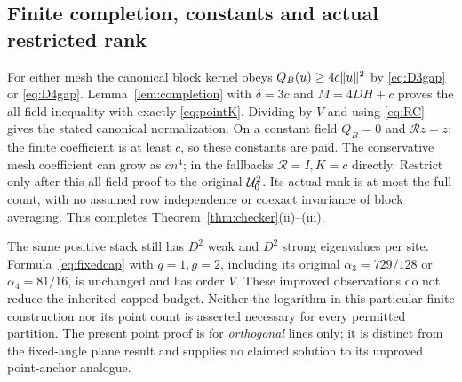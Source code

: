 \subsection{Finite completion, constants and actual restricted rank}
For either mesh the canonical block kernel obeys
$Q_B(u)\geq4c\lVert u\rVert^2$ by \eqref{eq:D3gap} or \eqref{eq:D4gap}.
Lemma~\ref{lem:completion} with $\delta=3c$ and $M=4DH+c$ proves the
all-field inequality with exactly \eqref{eq:pointK}. Dividing by $V$ and
using \eqref{eq:RC} gives the stated canonical normalization. On a constant
field $Q_B=0$ and $\mathcal Rz=z$; the finite coefficient is at least $c$,
so these constants are paid. The conservative mesh coefficient can grow as
$cn^4$; in the fallbacks $\mathcal R=I,K=c$ directly.
Restrict only after this all-field proof to the original $\mathcal U_0^2$.
Its actual rank is at most the full count, with no assumed row independence
or coexact invariance of block averaging. This completes
Theorem~\ref{thm:checker}(ii)--(iii).

The same positive stack still has $D^2$ weak and $D^2$ strong eigenvalues per
site. Formula~\eqref{eq:fixedcap} with $q=1,g=2$, including its original
$\alpha_3=729/128$ or $\alpha_4=81/16$, is unchanged and has order $V$.
These improved observations do not reduce the inherited capped budget.
Neither the logarithm in this particular finite construction nor its point
count is asserted necessary for every permitted partition. The present
point proof is for \emph{orthogonal} lines only; it is distinct from the
fixed-angle plane result and supplies no claimed solution to its unproved
point-anchor analogue.
